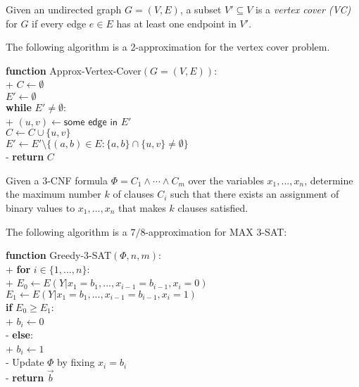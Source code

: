 \documentclass{article}
\begin{document}
\begin{definition}
	Given an undirected graph $G=(V,E)$, a subset $V'\subseteq V$ is a
	\emph{vertex cover (VC)} for $G$ if every edge $e\in E$ has at least one
	endpoint in $V'$.
\end{definition}

\begin{theorem}
	The following algorithm is a 2-approximation for the vertex cover
	problem.	
	\begin{pseudo}
	\textbf{function} \textsf{Approx-Vertex-Cover}$(G=(V,E))$:\\+
		$C\leftarrow \emptyset$\\
		$E'\leftarrow\emptyset$\\
		\textbf{while} $E'\not=\emptyset$:\\+
			$(u,v)\leftarrow\textsf{some edge in }E'$\\
			$C\leftarrow C\cup\{u,v\}$\\
			$E'\leftarrow E'\setminus\{(a,b)\in E : \{a,b\}\cap\{u,v\}\not=\emptyset\}$\\-
		\textbf{return} $C$
	\end{pseudo}
\end{theorem}

\begin{definition}
	Given a 3-CNF formula $\Phi=C_1\wedge\cdots\wedge C_m$ over the variables
	$x_1, ..., x_n$, determine the maximum number $k$ of clauses $C_i$ such 
	that there exists an assignment of binary values to $x_1, ..., x_n$ that 
	makes $k$ clauses satisfied.
\end{definition}

\begin{theorem}
	The following algorithm is a $7/8$-approximation for \textsf{MAX 3-SAT}:
	\begin{pseudo}
	\textbf{function} \textsf{Greedy-3-SAT}$(\Phi, n, m)$:\\+
		\textbf{for} $i\in\{1,...,n\}$:\\+
			$E_0 \leftarrow E(Y|x_1=b_1, ...,x_{i-1}=b_{i-1},x_i=0)$\\
			$E_1 \leftarrow E(Y|x_1=b_1, ...,x_{i-1}=b_{i-1},x_i=1)$\\
			\textbf{if} $E_0\geq E_1$:\\+
				$b_i\leftarrow 0$\\-
			\textbf{else}:\\+
				$b_i\leftarrow 1$\\-
			Update $\Phi$ by fixing $x_i=b_i$\\-
		\textbf{return }$\vec b$
	\end{pseudo}
\end{theorem}
\end{document}
